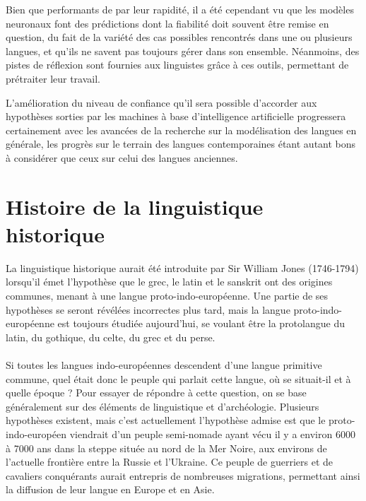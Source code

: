 \documentclass[12pt, twoside]{report}
\begin{document}
Bien que performants de par leur rapidité, il a été cependant vu que les modèles neuronaux font des prédictions dont la fiabilité doit souvent être remise en question, du fait de la variété des cas possibles rencontrés dans une ou plusieurs langues, et qu'ils ne savent pas toujours gérer dans son ensemble. Néanmoins, des pistes de réflexion sont fournies aux linguistes grâce à ces outils, permettant de prétraiter leur travail.

L'amélioration du niveau de confiance qu'il sera possible d'accorder aux hypothèses sorties par les machines à base d'intelligence artificielle progressera certainement avec les avancées de la recherche sur la modélisation des langues en générale, les progrès sur le terrain des langues contemporaines étant autant bons à considérer que ceux sur celui des langues anciennes.

\printbibliography[heading=bibintoc]

\appendix

\chapter{Histoire de la linguistique historique} \label{histoire_LH}

\indent La linguistique historique aurait été introduite par Sir William Jones (1746-1794) lorsqu'il émet l'hypothèse que le grec, le latin et le sanskrit ont des origines communes, menant à une langue proto-indo-européenne. Une partie de ses hypothèses se seront révélées incorrectes plus tard, mais la langue proto-indo-européenne est toujours étudiée aujourd'hui, se voulant être la protolangue du latin, du gothique, du celte, du grec et du perse.  \\ \\ 
\indent Si toutes les langues indo-européennes descendent d'une langue primitive commune, quel était donc le peuple qui parlait cette langue, où se situait-il et à quelle époque ? Pour  essayer de répondre à cette question, on se base généralement sur des éléments de linguistique et d'archéologie. Plusieurs hypothèses existent, mais c'est actuellement l'hypothèse admise est que le proto-indo-européen viendrait d'un peuple semi-nomade ayant vécu il y a environ 6000 à 7000 ans dans la steppe située au nord de la Mer Noire, aux environs de  l'actuelle frontière entre la Russie et l'Ukraine. Ce peuple de guerriers et de cavaliers conquérants aurait entrepris de nombreuses migrations, permettant ainsi la diffusion de leur langue en Europe et en Asie.
\end{document}
